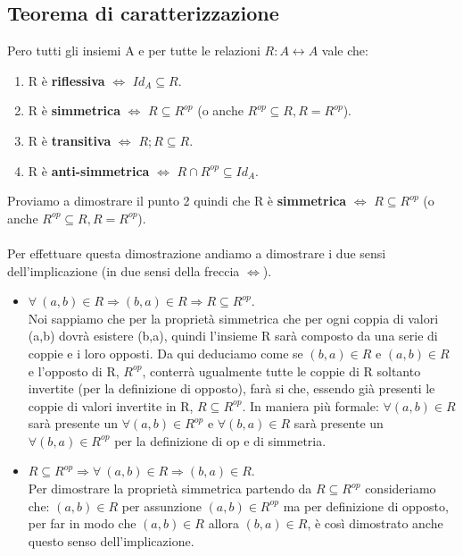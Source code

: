 \subsection{Teorema di caratterizzazione}
\begin{theorem}\label{Teorema-caratterizzazione}
    Pero tutti gli insiemi A e per tutte le relazioni $R: A \longleftrightarrow A$ vale che:
    \begin{enumerate}
        \item R è \textbf{riflessiva} $\Longleftrightarrow$ $Id_A \subseteq R$.
        \item R è \textbf{simmetrica} $\Longleftrightarrow$ $R \subseteq R^{op}$ (o anche $R^{op} \subseteq R, R = R^{op}$).
        \item R è \textbf{transitiva} $\Longleftrightarrow$ $R;R \subseteq R$.
        \item R è \textbf{anti-simmetrica} $\Longleftrightarrow$ $R \cap R^{op} \subseteq Id_A$.
    \end{enumerate}
\end{theorem}
\begin{demostration}[Simmetrica]
Proviamo a dimostrare il punto 2 quindi che R è \textbf{simmetrica} $\Longleftrightarrow$ $R \subseteq R^{op}$ (o anche $R^{op} \subseteq R, R = R^{op}$).\\\\
Per effettuare questa dimostrazione andiamo a dimostrare i due sensi dell'implicazione (in due sensi della freccia $\Longleftrightarrow$).
\begin{itemize}
    \item $\forall \: (a,b) \in R \Longrightarrow (b,a) \in R \Longrightarrow R \subseteq R^{op}$.\\
    Noi sappiamo che per la proprietà simmetrica che per ogni coppia di valori (a,b) dovrà esistere (b,a), quindi l'insieme R sarà composto da una serie di coppie e i loro opposti. Da qui deduciamo come se $(b,a) \in R$ e $(a,b) \in R$ e l'opposto di R, $R^{op}$, conterrà ugualmente tutte le coppie di R soltanto invertite (per la definizione di opposto), farà si che, essendo già presenti le coppie di valori invertite in R, $R \subseteq R^{op}$. In maniera più formale:
    $\forall (a,b) \in R$ sarà presente un $\forall (a,b) \in R^{op}$ e $\forall (b,a) \in R$ sarà presente un $\forall (b,a) \in R^{op}$ per la definizione di op e di simmetria.
    \item $R \subseteq R^{op} \Longrightarrow \forall \: (a,b) \in R \Longrightarrow (b,a) \in R $.\\
    Per dimostrare la proprietà simmetrica partendo da $R \subseteq R^{op}$ consideriamo che: $(a,b) \in R$ per assunzione $(a,b) \in R^{op}$ ma per definizione di opposto, per far in modo che $(a,b) \in R$ allora $(b,a) \in R$, è così dimostrato anche questo senso dell'implicazione.
 \end{itemize}
\end{demostration}

